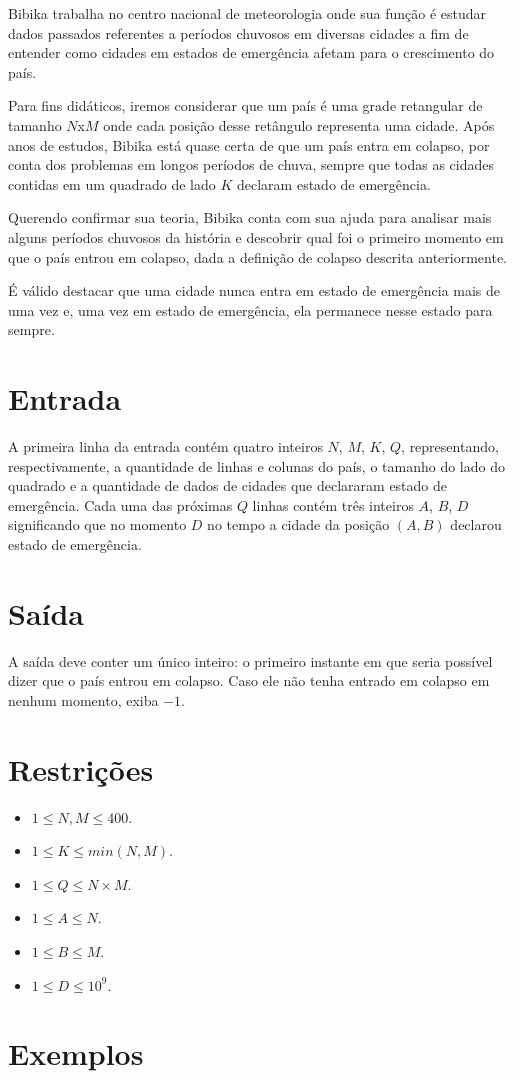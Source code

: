 Bibika trabalha no centro nacional de meteorologia onde sua função é estudar dados passados referentes a períodos chuvosos em diversas cidades a
fim de entender como cidades em estados de emergência afetam para o crescimento do país.

Para fins didáticos, iremos considerar que um país é uma grade retangular de tamanho $N$x$M$ onde cada posição desse retângulo representa uma cidade.
Após anos de estudos, Bibika está quase certa de que um país entra em colapso, por conta dos problemas em longos períodos de chuva, sempre que todas
as cidades contidas em um quadrado de lado $K$ declaram estado de emergência.

Querendo confirmar sua teoria, Bibika conta com sua ajuda para analisar mais alguns períodos chuvosos da história e descobrir qual foi o primeiro momento
em que o país entrou em colapso, dada a definição de colapso descrita anteriormente.

É válido destacar que uma cidade nunca entra em estado de emergência mais de uma vez e, uma vez em estado de emergência, ela permanece nesse estado para sempre.

\section*{Entrada}

A primeira linha da entrada contém quatro inteiros $N$, $M$, $K$, $Q$, representando, respectivamente, a quantidade de linhas e colunas do país,
o tamanho do lado do quadrado e a quantidade de dados de cidades que declararam estado de emergência.
Cada uma das próximas $Q$ linhas contém três inteiros $A$, $B$, $D$ significando que no momento $D$ no tempo a cidade da posição $(A,B)$ declarou estado
de emergência.

\section*{Saída}

A saída deve conter um único inteiro: o primeiro instante em que seria possível dizer que o país entrou em colapso.
Caso ele não tenha entrado em colapso em nenhum momento, exiba $-1$.

\section*{Restrições}

\begin{itemize}
\item $1 \leq N, M \leq 400$.
\item $1 \leq K \leq min(N, M)$.
\item $1 \leq Q \leq N \times M$.
\item $1 \leq A \leq N$.
\item $1 \leq B \leq M$.
\item $1 \leq D \leq 10^9$.
\end{itemize}


\section*{Exemplos}

\exemplo
